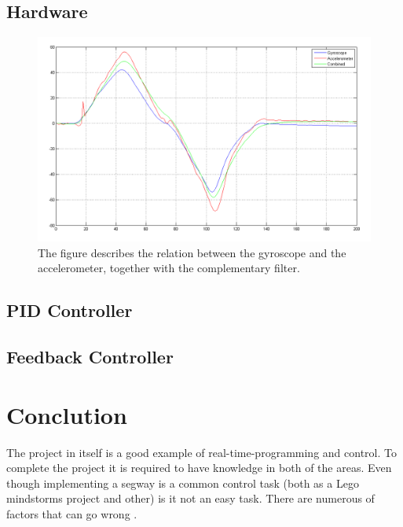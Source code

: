 \documentclass[a4paper]{article}
\begin{document}
\subsection{Hardware}

\begin{figure}[H]
  \centering
\includegraphics[scale=0.456]{pic/GyroAccCombAng.png}
\caption{The figure describes the relation between the gyroscope and the accelerometer, together with the complementary filter.}
\end{figure}




\subsection{PID Controller}

\subsection{Feedback Controller}

\section{Conclution}
The project in itself is a good example of real-time-programming and control. To complete the project it is required to have knowledge in both of the areas. Even though implementing a segway is a common control task (both as a Lego mindstorms project and other) is it not an easy task. There are numerous of factors that can go wrong .\\
\end{document}
